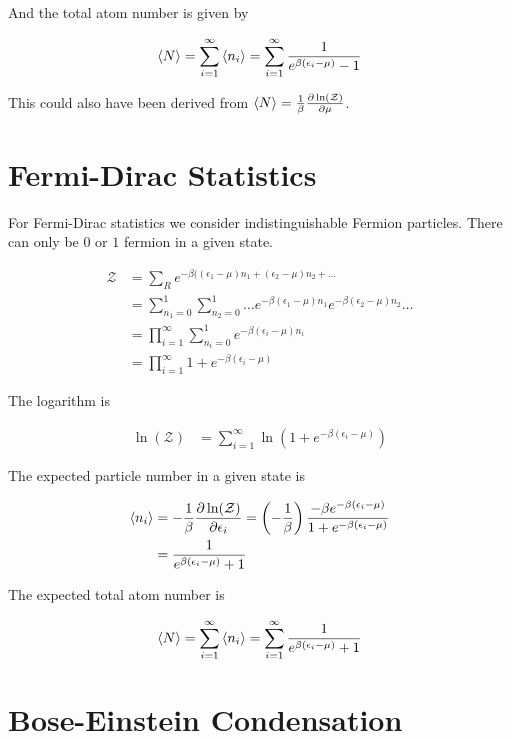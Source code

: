 \documentclass[12pt]{article}
\newcommand{\ep}{\epsilon}
\newcommand{\mc}[1]{\mathcal{#1}}
\begin{document}
And the total atom number is given by

\begin{align}
\Braket{N} = \sum_{i=1}^{\infty} \braket{n_i} = \sum_{i=1}^{\infty} \frac{1}{e^{\beta(\ep_i-\mu)}-1}
\end{align}

This could also have been derived from $\Braket{N} = \frac{1}{\beta} \frac{\partial \ln(\mc{Z})}{\partial \mu}$.

\section{Fermi-Dirac Statistics}

For Fermi-Dirac statistics we consider indistinguishable Fermion particles. There can only be $0$ or $1$ fermion in a given state.

\begin{align}
\mc{Z} &= \sum_R e^{-\beta((\ep_1-\mu)n_1 + (\ep_2-\mu)n_2 + \ldots}\\
&= \sum_{n_1=0}^1 \sum_{n_2=0}^1\ldots e^{-\beta(\ep_1-\mu)n_1}e^{-\beta(\ep_2-\mu)n_2}\ldots\\
&= \prod_{i=1}^{\infty}\sum_{n_i=0}^1 e^{-\beta(\ep_i-\mu)n_i}\\
&= \prod_{i=1}^{\infty} 1+e^{-\beta(\ep_i-\mu)}
\end{align}

The logarithm is

\begin{align}
\ln(\mc{Z}) &= \sum_{i=1}^{\infty} \ln(1+e^{-\beta(\ep_i-\mu)})
\end{align}

The expected particle number in a given state is

\begin{align}
\braket{n_i} &= -\frac{1}{\beta} \frac{\partial \ln(\mc{Z})}{\partial \ep_i} = \left(-\frac{1}{\beta}\right)\frac{-\beta e^{-\beta(\ep_i-\mu)}}{1+e^{-\beta(\ep_i-\mu)}}\\
&= \frac{1}{e^{\beta(\ep_i-\mu)}+1}
\end{align}

The expected total atom number is

\begin{align}
\Braket{N} = \sum_{i=1}^{\infty} \braket{n_i} = \sum_{i=1}^{\infty} \frac{1}{e^{\beta(\ep_i-\mu)}+1}
\end{align}

\section{Bose-Einstein Condensation}
\end{document}
